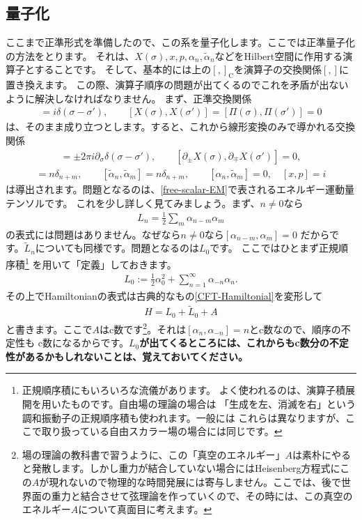 \documentclass[report,paper=a4, fontsize=12pt, line_length=16cm, number_of_lines=33,dvipdfmx]{jlreq}
\numberwithin{equation}{chapter}
\numberwithin{equation}{section}
\newcommand{\del}{\partial}
\newcommand{\kyou}[1]{{\sffamily \bfseries #1}}
\newcommand{\alphat}{\tilde{\alpha}}
\newcommand{\Lt}{\widetilde{L}}
\newcommand{\cbk}[1]{[#1]_{\mathrm{C}}}
\begin{document}
\subsection{量子化}
ここまで正準形式を準備したので、この系を量子化します。ここでは正準量子化の方法をとります。
それは、$X(\sigma),x,p,\alpha_n,\alphat_n$などをHilbert空間に作用する演算子とすることです。
そして、基本的には上の$\cbk{,}$を演算子の交換関係$[,]$に置き換えます。
この際、演算子順序の問題が出てくるのでこれを矛盾が出ないように解決しなければなりません。
まず、正準交換関係
\begin{align}
[X(\sigma),\Pi(\sigma')]=i\delta(\sigma-\sigma'),\qquad
[X(\sigma),X(\sigma')]=
[\Pi(\sigma),\Pi(\sigma')]=0
\end{align}
は、そのまま成り立つとします。すると、これから線形変換のみで導かれる交換関係
\begin{align}
[\del_{\pm}X(\sigma),\del_{\pm}X(\sigma')]
=\pm 2\pi i \del_{\sigma}\delta(\sigma-\sigma'),\qquad
[\del_{\pm}X(\sigma),\del_{\mp}X(\sigma')]=0,
\end{align}
\begin{align}
[\alpha_{n},\alpha_{m}]=n\delta_{n+m},\qquad
[\alphat_{n},\alphat_{m}]=n\delta_{n+m},\qquad
[\alpha_{n},\alphat_{m}]=0,\quad
[x,p]=i
\end{align}
は導出されます。問題となるのは、\eqref{free-scalar-EM}で表されるエネルギー運動量テンソルです。
これを少し詳しく見てみましょう。まず、$n\ne 0$なら
\begin{align}
L_n=\frac12 \sum_m \alpha_{n-m}\alpha_{m}
\end{align}
の表式には問題はありません。なぜなら$n\ne 0$なら$[\alpha_{n-m},\alpha_{m}]=0$
だからです。$\Lt_n$についても同様です。問題となるのは$L_0$です。
ここではひとまず正規順序積\footnote{正規順序積にもいろいろな流儀があります。
よく使われるのは、演算子積展開を用いたものです。自由場の理論の場合は
「生成を左、消滅を右」という調和振動子の正規順序積も使われます。一般には
これらは異なりますが、ここで取り扱っている自由スカラー場の場合には同じです。}
を用いて「定義」しておきます。
\begin{align}
L_0:=\frac12 \alpha_0^2+\sum_{n=1}^{\infty}\alpha_{-n}\alpha_{n}.
\end{align}
その上でHamiltonianの表式は古典的なもの\eqref{CFT-Hamiltonial}を変形して
\begin{align}
H=L_0+\Lt_0+A
\end{align}
と書きます。ここで$A$はc数です\footnote{場の理論の教科書で習うように、この「真空のエネルギー」$A$は素朴にやると発散します。しかし重力が結合していない場合にはHeisenberg方程式にこの$A$が現れないので物理的な時間発展には寄与しません。ここでは、後で世界面の重力と結合させて弦理論を作っていくので、その時には、この真空のエネルギー$A$について真面目に考えます。}。それは$[\alpha_n,\alpha_{-n}]=n$とc数なので、順序の不定性も
c数になるからです。\kyou{$L_0$が出てくるところには、これからもc数分の不定性があるかもしれないことは、覚えておいてください。}
\end{document}
